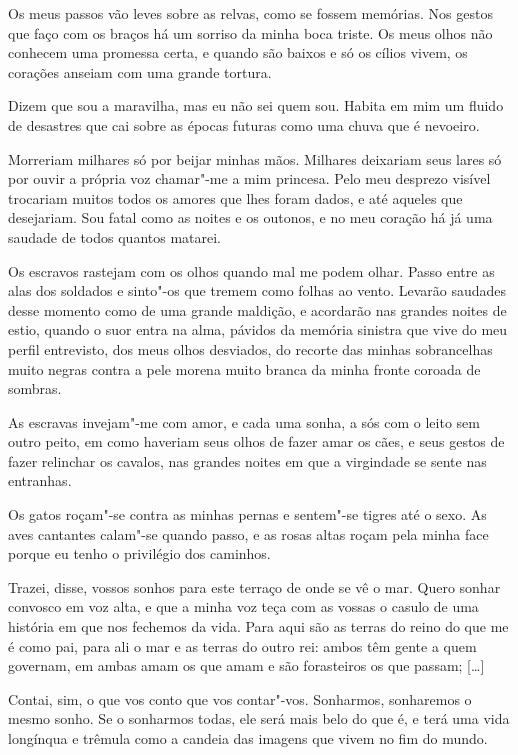 Os meus passos vão leves sobre as relvas, como se fossem memórias. Nos
gestos que faço com os braços há um sorriso da minha boca triste. Os
meus olhos não conhecem uma promessa certa, e quando são baixos e só
os cílios vivem, os corações anseiam com uma grande tortura. 

Dizem que sou a maravilha, mas eu não sei quem sou. Habita em mim um
fluido de desastres que cai sobre as épocas futuras como uma chuva
que é nevoeiro. 

Morreriam milhares só por beijar minhas mãos. Milhares deixariam seus
lares só por ouvir a própria voz chamar"-me a mim princesa. Pelo meu
desprezo visível trocariam muitos todos os amores que lhes foram
dados, e até aqueles que desejariam. Sou fatal como as noites e os
outonos, e no meu coração há já uma saudade de todos quantos matarei.


Os escravos rastejam com os olhos quando mal me podem olhar. Passo
entre as alas dos soldados e sinto"-os que tremem como folhas ao
vento. Levarão saudades desse momento como de uma grande maldição, e
acordarão nas grandes noites de estio, quando o suor entra na alma,
pávidos da memória sinistra que vive do meu perfil entrevisto, dos
meus olhos desviados, do recorte das minhas sobrancelhas muito negras
contra a pele morena muito branca da minha fronte coroada de sombras.

As escravas invejam"-me com amor, e cada uma sonha, a sós com o leito
sem outro peito, em como haveriam seus olhos de fazer amar os cães, e
seus gestos de fazer relinchar os cavalos, nas grandes noites em que
a virgindade se sente nas entranhas.

Os gatos roçam"-se contra as minhas pernas e sentem"-se tigres até o
sexo. As aves cantantes calam"-se quando passo, e as rosas altas roçam
pela minha face porque eu tenho o privilégio dos caminhos.

 Trazei, disse, vossos sonhos para este terraço de onde se
vê o mar. Quero sonhar convosco em voz alta, e que a minha voz teça
com as vossas o casulo de uma história em que nos fechemos da vida.
Para aqui são as terras do reino do que me é como pai, para ali o mar
e as terras do outro rei: ambos têm gente a quem governam, em ambas
amam os que amam e são forasteiros os que passam; [\ldots{}]

Contai, sim, o que vos conto que vos contar"-vos. Sonharmos, sonharemos
o mesmo sonho. Se o sonharmos todas, ele será mais belo do que é, e
terá uma vida longínqua e trêmula como a candeia das imagens que
vivem no fim do mundo.

